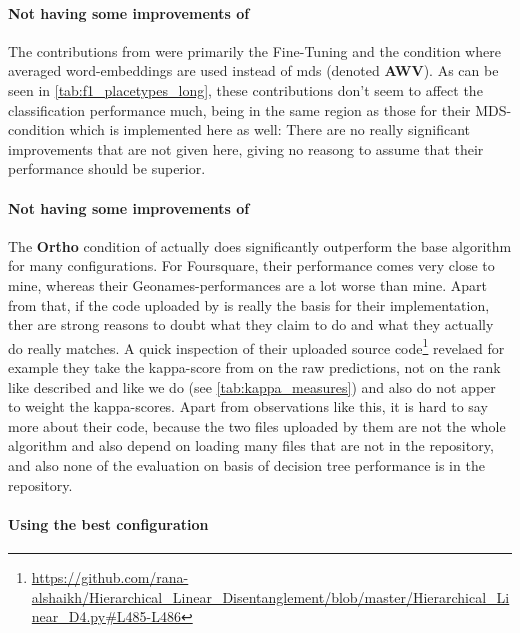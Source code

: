 \paragraph{Not having some improvements of \cite{Ager2018}}
The contributions from \cite{Ager2018} were primarily the Fine-Tuning and the condition where averaged word-embeddings are used instead of \gls{mds} (denoted \textbf{AWV}). As can be seen in \autoref{tab:f1_placetypes_long}, these contributions don't seem to affect the classification performance much, being in the same region as those for their MDS-condition which is implemented here as well: There are no really significant improvements that are not given here, giving no reasong to assume that their performance should be superior.  

\paragraph{Not having some improvements of \cite{Alshaikh2020}}

The \textbf{Ortho} condition of \cite{Alshaikh2020} actually does significantly outperform the base algorithm for many configurations. For Foursquare, their performance comes very close to mine, whereas their Geonames-performances are a lot worse than mine. Apart from that, if the code uploaded by \cite{Alshaikh2020} is really the basis for their implementation, ther are strong reasons to doubt what they claim to do and what they actually do really matches. A quick inspection of their uploaded source code\footnote{\url{https://github.com/rana-alshaikh/Hierarchical_Linear_Disentanglement/blob/master/Hierarchical_Linear_D4.py\#L485-L486}} revelaed for example they take the kappa-score from on the raw predictions, not on the rank like \cite{Derrac2015} described and like we do (see \autoref{tab:kappa_measures}) and also do not apper to weight the kappa-scores. Apart from observations like this, it is hard to say more about their code, because the two files uploaded by them are not the whole algorithm and also depend on loading many files that are not in the repository, and also none of the evaluation on basis of decision tree performance is in the repository.

\paragraph{Using the best configuration}

